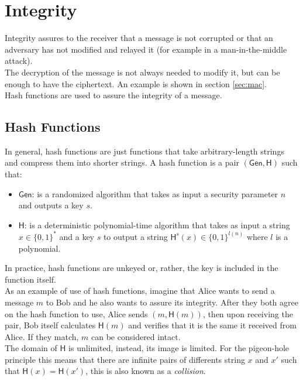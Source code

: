 \section{Integrity}
Integrity assures to the receiver that a message is not corrupted or that an adversary has not modified and relayed it (for example in a man-in-the-middle attack).\\
The decryption of the message is not always needed to modify it, but can be enough to have the ciphertext. An example is shown in section \ref{sec:mac}.\\
Hash functions are used to assure the integrity of a message.

\begin{nopbreak}
    \subsection{Hash Functions}
    In general, hash functions are just functions that take arbitrary-length strings and compress them into shorter strings.
    A hash function is a pair $(\mathsf{Gen}, \mathsf{H})$ such that:
    \begin{itemize}
        \item{$\mathsf{Gen}$: is a randomized algorithm that takes as input a security parameter $n$ and outputs a key $s$.}
        \item{$\mathsf{H}$: is a deterministic polynomial-time algorithm that takes as input a string $x \in \{0,1\}^*$ and a key $s$ to output a string $\mathsf{H}^s(x) \in \{0,1\}^{\mathit{l}(n)}$ where $\mathit{l}$ is a polynomial.}
    \end{itemize}
\end{nopbreak}
    In practice, hash functions are unkeyed or, rather, the key is included in the function itself.\\
    As an example of use of hash functions, imagine that Alice wants to send a message $m$ to Bob and he also wants to assure its integrity. After they both agree on the hash function to use, Alice sends $(m, \mathsf{H}(m))$, then upon receiving the pair, Bob itself calculates $\mathsf{H}(m)$ and verifies that it is the same it received from Alice. If they match, $m$ can be considered intact.\\
    The domain of $\mathsf{H}$ is unlimited, instead, its image is limited. For the pigeon-hole principle this means that there are infinite pairs of differents string $x$ and $x'$ such that $\mathsf{H}(x) = \mathsf{H}(x')$, this is also known as a \emph{collision}.

